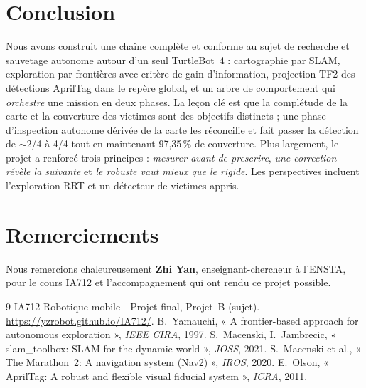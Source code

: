 \documentclass[10pt,twocolumn,a4paper]{article}
\begin{document}
\section{Conclusion}
Nous avons construit une cha\^ine compl\`ete et conforme au sujet de recherche et sauvetage autonome
autour d'un seul TurtleBot~4 : cartographie par SLAM, exploration par fronti\`eres avec crit\`ere de gain
d'information, projection TF2 des d\'etections AprilTag dans le rep\`ere global, et un arbre de
comportement qui \emph{orchestre} une mission en deux phases. La le\c{c}on cl\'e est que la compl\'etude
de la carte et la couverture des victimes sont des objectifs distincts ; une phase d'inspection autonome
d\'eriv\'ee de la carte les r\'econcilie et fait passer la d\'etection de $\sim$2/4 \`a 4/4 tout en
maintenant 97,35\,\% de couverture. Plus largement, le projet a renforc\'e trois principes :
\emph{mesurer avant de prescrire}, \emph{une correction r\'ev\`ele la suivante} et \emph{le robuste vaut
mieux que le rigide}. Les perspectives incluent l'exploration RRT et un d\'etecteur de victimes appris.

\section*{Remerciements}
Nous remercions chaleureusement \textbf{Zhi Yan}, enseignant-chercheur \`a l'ENSTA, pour le cours IA712 et
l'accompagnement qui ont rendu ce projet possible.

\begingroup
\scriptsize
\begin{thebibliography}{9}
\setlength{\itemsep}{0pt}
\setlength{\parskip}{0pt}
 IA712 Robotique mobile - Projet final, Projet~B (sujet). \url{https://yzrobot.github.io/IA712/}.
 B.~Yamauchi, « A frontier-based approach for autonomous exploration », \emph{IEEE CIRA}, 1997.
 S.~Macenski, I.~Jambrecic, « slam\_toolbox: SLAM for the dynamic world », \emph{JOSS}, 2021.
 S.~Macenski et al., « The Marathon~2: A navigation system (Nav2) », \emph{IROS}, 2020.
 E.~Olson, « AprilTag: A robust and flexible visual fiducial system », \emph{ICRA}, 2011.
\end{thebibliography}
\endgroup
\end{document}

